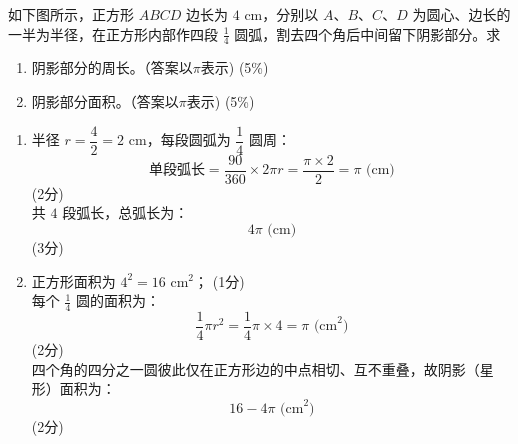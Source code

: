 \documentclass[12pt,a4paper]{exam-zh}
\begin{document}
\newpage
\begin{question}[points = 10]
    如下图所示，正方形 $ABCD$ 边长为 $4\text{ cm}$，分别以 $A$、$B$、$C$、$D$ 为圆心、边长的一半为半径，在正方形内部作四段 $\frac{1}{4}$ 圆弧，割去四个角后中间留下阴影部分。求
\begin{center}

\end{center}

    \begin{enumerate}[label=(\alph*)]
        \item 阴影部分的周长。（答案以$\pi$表示) \hfill (5\%)
        \item 阴影部分面积。（答案以$\pi$表示) \hfill (5\%)
    \end{enumerate}
\end{question}

\begin{solution}
    \begin{enumerate}[label=(\alph*)]
        \item 半径 $r = \dfrac{4}{2} = 2\text{ cm}$，每段圆弧为 $\dfrac{1}{4}$ 圆周： \\
        $$\text{单段弧长} = \frac{90}{360}\times 2\pi r = \frac{\pi \times 2}{2} = \pi \text{ (cm)}$$ \hfill (2分) \\
        共 $4$ 段弧长，总弧长为：
        $$4\pi \text{ (cm)}$$ \hfill (3分)

        \item 正方形面积为 $4^2 = 16\text{ cm}^2$； \hfill (1分) \\
        每个 $\frac{1}{4}$ 圆的面积为：
        $$\frac{1}{4}\pi r^2 = \frac{1}{4}\pi \times 4 = \pi \text{ (cm}^2\text{)}$$ \hfill (2分) \\
        四个角的四分之一圆彼此仅在正方形边的中点相切、互不重叠，故阴影（星形）面积为：
        $$16 - 4\pi \text{ (cm}^2\text{)}$$ \hfill (2分)
    \end{enumerate}
\end{solution}
\end{document}
